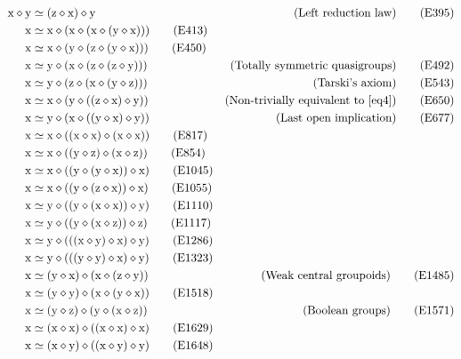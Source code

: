 \begin{align}
    \x \op \y &\formaleq (\z \op \x) \op \y & \hbox{(Left reduction law)} \label{eq395}\tag{E395} \\
    \x &\formaleq \x \op (\x \op (\x \op (\y \op \x))) \label{eq413}\tag{E413} \\
    \x &\formaleq \x \op (\y \op (\z \op (\y \op \x))) \label{eq450}\tag{E450} \\
    \x &\formaleq \y \op (\x \op (\z \op (\z \op \y))) & \hbox{(Totally symmetric quasigroups)} \label{eq492}\tag{E492} \\
    \x &\formaleq \y \op (\z \op (\x \op (\y \op \z))) & \hbox{(Tarski's axiom)} \label{eq543}\tag{E543} \\
    \x &\formaleq \x \op (\y \op ((\z \op \x) \op \y)) & \hbox{(Non-trivially equivalent to~\eqref{eq4})} \label{eq650}\tag{E650} \\
    \x &\formaleq \y \op (\x \op ((\y \op \x) \op \y)) & \hbox{(Last open implication)} \label{eq677}\tag{E677} \\
    \x &\formaleq \x \op ((\x \op \x) \op (\x \op \x)) \label{eq817}\tag{E817} \\
    \x &\formaleq \x \op ((\y \op \z) \op (\x \op \z)) \label{eq854}\tag{E854}\\
    \x &\formaleq \x \op ((\y \op (\y \op \x)) \op \x) \label{eq1045}\tag{E1045} \\
    \x &\formaleq \x \op ((\y \op (\z \op \x)) \op \x) \label{eq1055}\tag{E1055} \\
    \x &\formaleq \y \op ((\y \op (\x \op \x)) \op \y) \label{eq1110}\tag{E1110} \\
    \x &\formaleq \y \op ((\y \op (\x \op \z)) \op \z) \label{eq1117}\tag{E1117} \\
    \x &\formaleq \y \op (((\x \op \y) \op \x) \op \y) \label{eq1286}\tag{E1286} \\
    \x &\formaleq \y \op (((\y \op \y) \op \x) \op \y) \label{eq1323}\tag{E1323} \\
    \x &\formaleq (\y \op \x) \op (\x \op (\z \op \y)) & \hbox{(Weak central groupoids)}\label{eq1485}\tag{E1485} \\
    \x &\formaleq (\y \op \y) \op (\x \op (\y \op \x)) \label{eq1518}\tag{E1518} \\
    \x &\formaleq (\y \op \z) \op (\y \op (\x \op \z)) & \hbox{(Boolean groups)} \label{eq1571}\tag{E1571} \\
    \x &\formaleq (\x \op \x) \op ((\x \op \x) \op \x) \label{eq1629}\tag{E1629} \\
    \x &\formaleq (\x \op \y) \op ((\x \op \y) \op \y) \label{eq1648}\tag{E1648} \\

\end{align}

